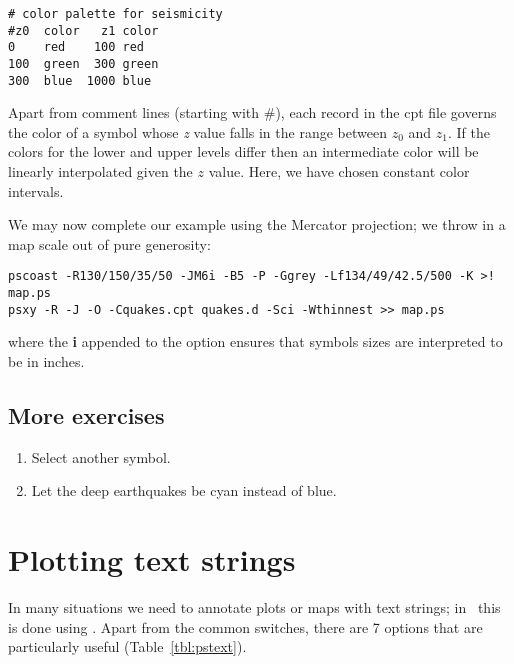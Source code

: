 \documentclass{report}
\begin{document}
\begin{verbatim}
# color palette for seismicity
#z0  color   z1 color
0    red    100 red
100  green  300 green
300  blue  1000 blue
\end{verbatim} 

Apart from comment lines (starting with \#), each record in the cpt file
governs the color of a symbol whose {\it z} value falls in the range between
$z_0$ and $z_1$.  If the colors for the lower and upper levels differ
then an intermediate color will be linearly interpolated given the $z$
value.  Here, we have chosen constant color intervals.

We may now complete our example using the Mercator projection; we throw in a
map scale out of pure generosity:

\begin{verbatim} 
pscoast -R130/150/35/50 -JM6i -B5 -P -Ggrey -Lf134/49/42.5/500 -K >! map.ps
psxy -R -J -O -Cquakes.cpt quakes.d -Sci -Wthinnest >> map.ps
\end{verbatim} 

\noindent
where the {\bf i} appended to the  option ensures that symbols
sizes are interpreted to be in inches.
\subsection{More exercises}

\begin{enumerate}

\item Select another symbol.

\item Let the deep earthquakes be cyan instead of blue.

\end{enumerate}

\section{Plotting text strings}

In many situations we need to annotate plots or maps with text strings;
in \GMT\ this is done using .  Apart from the common
switches, there are 7 options that are particularly useful (Table~\ref{tbl:pstext}).
\end{document}
